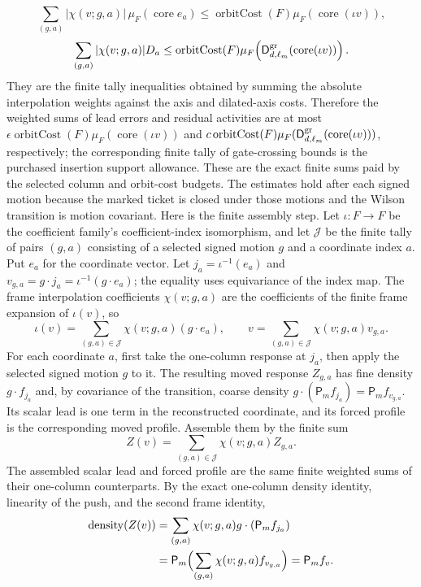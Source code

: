 \[
 \sum_{(g,a)}|\chi(v;g,a)|\,\mu_F(\operatorname{core}e_a)
 \leq \operatorname{orbitCost}(F)\mu_F(\operatorname{core}(\iota v)),
\]
\[
 \sum_{(g,a)}|\chi(v;g,a)|D_a
 \leq \operatorname{orbitCost}(F)\mu_F\!\left(\mathsf D^{\rm gr}_{d,\ell_m}(\operatorname{core}(\iota v))\right).
\]
They are the finite tally inequalities obtained by summing the absolute interpolation weights against the axis and dilated-axis costs. Therefore the weighted sums of lead errors and residual activities are at most $\epsilon\operatorname{orbitCost}(F)\mu_F(\operatorname{core}(\iota v))$ and $c\operatorname{orbitCost}(F)\mu_F(\mathsf D^{\rm gr}_{d,\ell_m}(\operatorname{core}(\iota v)))$, respectively; the corresponding finite tally of gate-crossing bounds is the purchased insertion support allowance. These are the exact finite sums paid by the selected column and orbit-cost budgets. The estimates hold after each signed motion because the marked ticket is closed under those motions and the Wilson transition is motion covariant.
Here is the finite assembly step. Let $\iota:F\to F$ be the coefficient family's coefficient-index isomorphism, and let $\mathcal J$ be the finite tally of pairs $(g,a)$ consisting of a selected signed motion $g$ and a coordinate index $a$. Put $e_a$ for the coordinate vector. Let $j_a=\iota^{-1}(e_a)$ and $v_{g,a}=g\cdot j_a=\iota^{-1}(g\cdot e_a)$; the equality uses equivariance of the index map. The frame interpolation coefficients $\chi(v;g,a)$ are the coefficients of the finite frame expansion of $\iota(v)$, so
\[
 \iota(v)=\sum_{(g,a)\in\mathcal J}\chi(v;g,a)(g\cdot e_a),\qquad
 v=\sum_{(g,a)\in\mathcal J}\chi(v;g,a)v_{g,a}.
\]
For each coordinate $a$, first take the one-column response at $j_a$, then apply the selected signed motion $g$ to it. The resulting moved response $Z_{g,a}$ has fine density $g\cdot f_{j_a}$ and, by covariance of the transition, coarse density $g\cdot(\mathsf P_m f_{j_a})=\mathsf P_m f_{v_{g,a}}$. Its scalar lead is one term in the reconstructed coordinate, and its forced profile is the corresponding moved profile. Assemble them by the finite sum
\[
 Z(v)=\sum_{(g,a)\in\mathcal J}\chi(v;g,a)Z_{g,a}.
\]
The assembled scalar lead and forced profile are the same finite weighted sums of their one-column counterparts. By the exact one-column density identity, linearity of the push, and the second frame identity,
\begin{align*}
 \operatorname{density}(Z(v))
 &=\sum_{(g,a)}\chi(v;g,a)g\cdot(\mathsf P_m f_{j_a})\\
 &=\mathsf P_m\Bigl(\sum_{(g,a)}\chi(v;g,a)f_{v_{g,a}}\Bigr)
 =\mathsf P_m f_v.
\end{align*}

